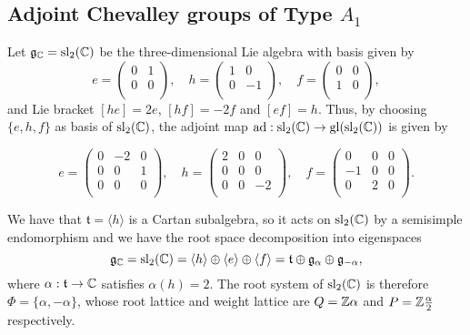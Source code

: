 \subsection{Adjoint Chevalley groups of Type $A_1$}

Let $\mathfrak{g}_{\mathbb{C}}=\mathrm{sl}_2(\mathbb{C})$ be the three-dimensional Lie algebra with basis given by
$$e=\begin{pmatrix}
    0 & 1\\
    0 & 0\\
\end{pmatrix},\quad h=\begin{pmatrix}
    1 & 0\\
    0 & -1\\
\end{pmatrix},\quad f=\begin{pmatrix}
    0 & 0\\
    1 & 0\\
\end{pmatrix},$$
and Lie bracket $[he]=2e$, $[hf]=-2f$ and $[ef]=h$. Thus, by choosing $\{e,h,f\}$ as basis of $\mathrm{sl}_2(\mathbb{C})$, the adjoint map $\mathrm{ad}:\mathrm{sl}_2(\mathbb{C})\to\mathrm{gl}(\mathrm{sl}_2(\mathbb{C}))$ is given by 

$$e=\begin{pmatrix}
    0 & -2 & 0\\
    0 & 0 & 1\\
    0 & 0 & 0\\
\end{pmatrix},\quad h=\begin{pmatrix}
    2 & 0 & 0\\
    0 & 0 & 0\\
    0 & 0 & -2\\
\end{pmatrix},\quad f=\begin{pmatrix}
    0 & 0 & 0\\
    -1 & 0 & 0\\
    0 & 2 & 0\\
\end{pmatrix}.$$

We have that $\mathfrak{t}=\langle h\rangle$ is a Cartan subalgebra, so it acts on $\mathrm{sl}_2(\mathbb{C})$ by a semisimple endomorphism and we have the root space decomposition into eigenspaces 
$$\mathfrak{g}_{\mathbb{C}}=\mathrm{sl}_2(\mathbb{C})=\langle h\rangle\oplus\langle e\rangle\oplus\langle f\rangle=\mathfrak{t}\oplus\mathfrak{g}_\alpha\oplus\mathfrak{g}_{-\alpha},$$
where $\alpha:\mathfrak{t}\to\mathbb{C}$ satisfies $\alpha(h)=2$. The root system of $\mathrm{sl}_2(\mathbb{C})$ is therefore $\Phi=\{\alpha,-\alpha\}$, whose root lattice and weight lattice are $Q=\mathbb{Z}\alpha$ and $P=\mathbb{Z}\frac{\alpha}{2}$ respectively.

